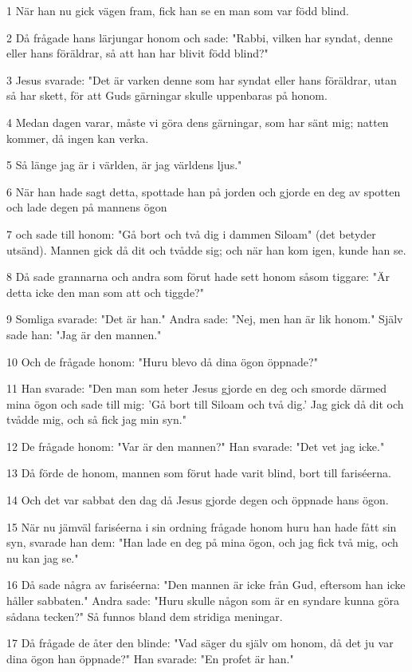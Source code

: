 \par 1 När han nu gick vägen fram, fick han se en man som var född blind.
\par 2 Då frågade hans lärjungar honom och sade: "Rabbi, vilken har syndat, denne eller hans föräldrar, så att han har blivit född blind?"
\par 3 Jesus svarade: "Det är varken denne som har syndat eller hans föräldrar, utan så har skett, för att Guds gärningar skulle uppenbaras på honom.
\par 4 Medan dagen varar, måste vi göra dens gärningar, som har sänt mig; natten kommer, då ingen kan verka.
\par 5 Så länge jag är i världen, är jag världens ljus."
\par 6 När han hade sagt detta, spottade han på jorden och gjorde en deg av spotten och lade degen på mannens ögon
\par 7 och sade till honom: "Gå bort och två dig i dammen Siloam" (det betyder utsänd). Mannen gick då dit och tvådde sig; och när han kom igen, kunde han se.
\par 8 Då sade grannarna och andra som förut hade sett honom såsom tiggare: "Är detta icke den man som att och tiggde?"
\par 9 Somliga svarade: "Det är han." Andra sade: "Nej, men han är lik honom." Själv sade han: "Jag är den mannen."
\par 10 Och de frågade honom: "Huru blevo då dina ögon öppnade?"
\par 11 Han svarade: "Den man som heter Jesus gjorde en deg och smorde därmed mina ögon och sade till mig: 'Gå bort till Siloam och två dig.' Jag gick då dit och tvådde mig, och så fick jag min syn."
\par 12 De frågade honom: "Var är den mannen?" Han svarade: "Det vet jag icke."
\par 13 Då förde de honom, mannen som förut hade varit blind, bort till fariséerna.
\par 14 Och det var sabbat den dag då Jesus gjorde degen och öppnade hans ögon.
\par 15 När nu jämväl fariséerna i sin ordning frågade honom huru han hade fått sin syn, svarade han dem: "Han lade en deg på mina ögon, och jag fick två mig, och nu kan jag se."
\par 16 Då sade några av fariséerna: "Den mannen är icke från Gud, eftersom han icke håller sabbaten." Andra sade: "Huru skulle någon som är en syndare kunna göra sådana tecken?" Så funnos bland dem stridiga meningar.
\par 17 Då frågade de åter den blinde: "Vad säger du själv om honom, då det ju var dina ögon han öppnade?" Han svarade: "En profet är han."
